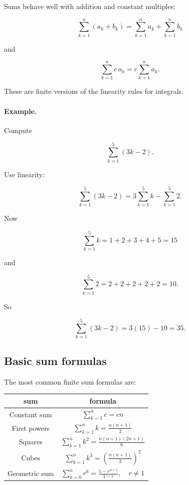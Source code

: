 Sums behave well with addition and constant multiples:

\[
\boxed{
\sum_{k=1}^n (a_k+b_k)
=
\sum_{k=1}^n a_k+\sum_{k=1}^n b_k
}
\]

and

\[
\boxed{
\sum_{k=1}^n c\,a_k
=
c\sum_{k=1}^n a_k.
}
\]

These are finite versions of the linearity rules for integrals.

\paragraph{Example.}
Compute

\[
\sum_{k=1}^5 (3k-2).
\]

Use linearity:

\[
\sum_{k=1}^5 (3k-2)
=
3\sum_{k=1}^5 k-\sum_{k=1}^5 2.
\]

Now

\[
\sum_{k=1}^5 k=1+2+3+4+5=15
\]

and

\[
\sum_{k=1}^5 2=2+2+2+2+2=10.
\]

So

\[
\boxed{
\sum_{k=1}^5 (3k-2)=3(15)-10=35.
}
\]

\subsection{Basic sum formulas}
\label{appsubsec:basic-sum-formulas}

The most common finite sum formulas are:

\begin{center}
\renewcommand{\arraystretch}{1.8}
\begin{tabular}{c|c}
\textbf{sum} & \textbf{formula} \\ \hline
Constant sum &
\(\displaystyle \sum_{k=1}^n c=cn\) \\

First powers &
\(\displaystyle \sum_{k=1}^n k=\frac{n(n+1)}2\) \\

Squares &
\(\displaystyle \sum_{k=1}^n k^2=\frac{n(n+1)(2n+1)}6\) \\

Cubes &
\(\displaystyle \sum_{k=1}^n k^3=\left(\frac{n(n+1)}2\right)^2\) \\

Geometric sum &
\(\displaystyle \sum_{k=0}^{n} r^k=\frac{1-r^{n+1}}{1-r},\quad r\neq1\)
\end{tabular}
\end{center}

